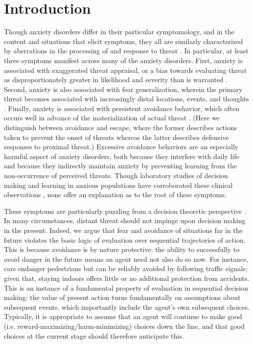 \documentclass[manuscript]{stjour}
\begin{document}
\section{Introduction}

Though anxiety disorders differ in their particular symptomology, and in the content and situations that elicit symptoms, they all are similarly characterized by aberrations in the processing of and response to threat \citep{dsm5}. In particular, at least three symptoms manifest across many of the anxiety disorders. First, anxiety is associated with exaggerated threat appraisal, or a bias towards evaluating threat as disproportionately greater in likelihood and severity than is warranted \citep{ClarkBeck2011}. Second, anxiety is also associated with fear generalization, wherein the primary threat becomes associated with increasingly distal locations, events, and thoughts \citep{dymond2015}. Finally, anxiety is associated with persistent avoidance behavior, which often occurs well in advance of the materialization of actual threat \citep{Arnaudova2017}. (Here we distinguish between avoidance and escape, where the former describes actions taken to prevent the onset of threats whereas the latter describes defensive responses to proximal threat.) Excessive avoidance behaviors are an especially harmful aspect of anxiety disorders, both because they interfere with daily life and because they indirectly maintain anxiety by preventing learning from the non-occurrence of perceived threats. Though laboratory studies of decision making and learning in anxious populations have corroborated these clinical observations \citep{Harle2017, norbury2018, Aylward2019}, none offer an explanation as to the root of these symptoms.

These symptoms are particularly puzzling from a decision theoretic perspective \citep{huys2015}. In many circumstances, distant threat should not impinge upon decision making in the present. Indeed, we argue that fear and avoidance of situations far in the future violates the basic logic of evaluation over sequential trajectories of action. This is because avoidance is by nature protective: the ability to successfully to avoid danger in the future means an agent need not also do so now. For instance, cars endanger pedestrians but can be reliably avoided by following traffic signals; given that, staying indoors offers little or no additional protection from accidents. This is an instance of a fundamental property of evaluation in sequential decision making: the value of present action turns fundamentally on assumptions about subsequent events, which importantly include the agent's own subsequent choices. Typically, it is appropriate to assume that an agent will continue to make good (i.e. reward-maximizing/harm-minimizing) choices down the line, and that good choices at the current stage should therefore anticipate this.
\end{document}
